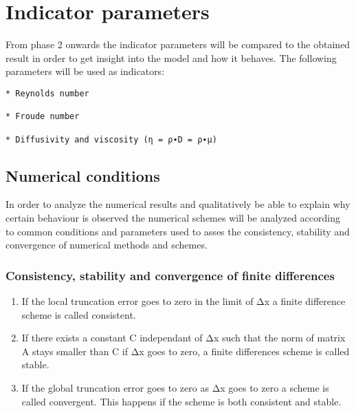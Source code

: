 \label{data-analysis}

\section{Indicator parameters}\label{indicator-parameters}

From phase 2 onwards the indicator parameters will be compared to the
obtained result in order to get insight into the model and how it
behaves. The following parameters will be used as indicators: 

\begin{verbatim}
* Reynolds number

* Froude number

* Diffusivity and viscosity (η = ρ∙D = ρ∙μ)
\end{verbatim}

\subsection{Numerical conditions}\label{numerical-conditions}

In order to analyze the numerical results and qualitatively be able to
explain why certain behaviour is observed the numerical schemes will be
analyzed according to common conditions and parameters used to asses the
consistency, stability and convergence of numerical methods and schemes.

\subsubsection{Consistency, stability and convergence of finite
differences}\label{consistency-stability-and-convergence-of-finite-differences}

\begin{enumerate}
\def\labelenumi{\arabic{enumi}.}
\item
  If the local truncation error goes to zero in the limit of Δx a finite
  difference scheme is called consistent.
\item
  If there exists a constant C independant of Δx such that the norm of
  matrix A stays smaller than C if Δx goes to zero, a finite differences
  scheme is called stable.
\item
  If the global truncation error goes to zero as Δx goes to zero a
  scheme is called convergent. This happens if the scheme is both
  consistent and stable.
\end{enumerate}

